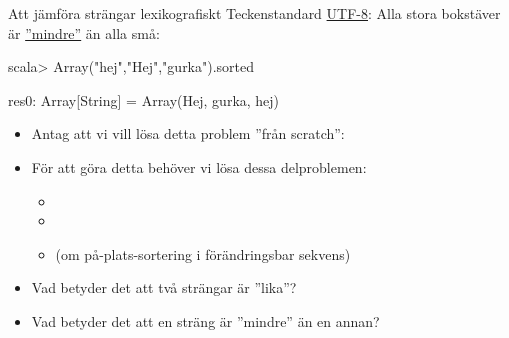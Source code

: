 


\begin{Slide}{Att jämföra strängar lexikografiskt}\SlideFontSmall
Teckenstandard \href{https://sv.wikipedia.org/wiki/UTF-8}{UTF-8}: Alla stora bokstäver är \href{https://www.youtube.com/watch?v=MijmeoH9LT4}{''mindre''} än alla små:
\begin{REPLnonum}
scala> Array("hej","Hej","gurka").sorted
\end{REPLnonum}
\pause\vspace{-1.2em}
\begin{REPLnonum}
res0: Array[String] = Array(Hej, gurka, hej)\end{REPLnonum}
\pause
\begin{itemize}
\item Antag att vi vill lösa detta problem ''från scratch'': \\ 
\item För att göra detta behöver vi lösa dessa delproblemen:
\begin{itemize}\SlideFontTiny
\item {} 
\item {}
\item {} (om på-plats-sortering i förändringsbar sekvens)
\end{itemize}
\item Vad betyder det att två strängar är ''lika''?

\item Vad betyder det att en sträng är ''mindre'' än en annan?
\end{itemize}

\end{Slide}

